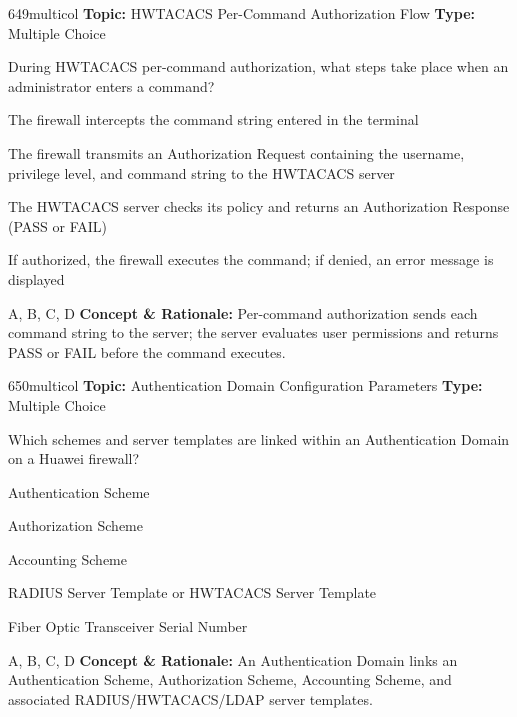 \begin{qcard}{649}{multicol}
\textcolor{darkslate!75}{\small\textbf{Topic:} HWTACACS Per-Command Authorization Flow \hfill \textbf{Type:} Multiple Choice}\vspace{0.4em}\par
During HWTACACS per-command authorization, what steps take place when an administrator enters a command?
\begin{qoptions}
\item The firewall intercepts the command string entered in the terminal
\item The firewall transmits an Authorization Request containing the username, privilege level, and command string to the HWTACACS server
\item The HWTACACS server checks its policy and returns an Authorization Response (PASS or FAIL)
\item If authorized, the firewall executes the command; if denied, an error message is displayed
\end{qoptions}
\end{qcard}
\nopagebreak
\begin{explainbox}{A, B, C, D}
\textbf{Concept \& Rationale:} Per-command authorization sends each command string to the server; the server evaluates user permissions and returns PASS or FAIL before the command executes.
\end{explainbox}

\begin{qcard}{650}{multicol}
\textcolor{darkslate!75}{\small\textbf{Topic:} Authentication Domain Configuration Parameters \hfill \textbf{Type:} Multiple Choice}\vspace{0.4em}\par
Which schemes and server templates are linked within an Authentication Domain on a Huawei firewall?
\begin{qoptions}
\item Authentication Scheme
\item Authorization Scheme
\item Accounting Scheme
\item RADIUS Server Template or HWTACACS Server Template
\item Fiber Optic Transceiver Serial Number
\end{qoptions}
\end{qcard}
\nopagebreak
\begin{explainbox}{A, B, C, D}
\textbf{Concept \& Rationale:} An Authentication Domain links an Authentication Scheme, Authorization Scheme, Accounting Scheme, and associated RADIUS/HWTACACS/LDAP server templates.
\end{explainbox}


